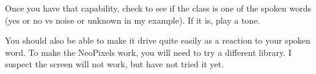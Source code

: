 Once you have that capability, check to see if the class is one of the spoken words (yes or no vs 
noise or unknown in my example). If it is, play a tone. 

You should also be able to make it drive quite easily as a reaction to your spoken word. To make 
the NeoPixels work, you will need to try a different library. I suspect the screen will not work, but
have not tried it yet.







